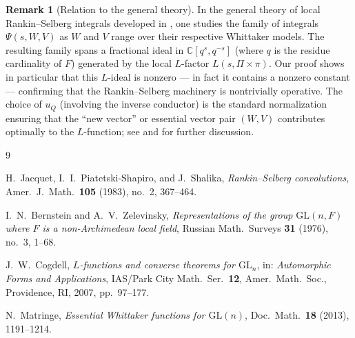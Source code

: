 \documentclass[12pt]{article}
\theoremstyle{definition}
\newtheorem{remark}[theorem]{Remark}
\begin{document}
\begin{remark}[Relation to the general theory]
  In the general theory of local Rankin--Selberg integrals developed in \cite{JPSS83},
  one studies the family of integrals $\Psi(s, W, V)$ as $W$ and $V$ range over their
  respective Whittaker models. The resulting family spans a fractional ideal in
  $\mathbb{C}[q^s, q^{-s}]$ (where $q$ is the residue cardinality of $F$) generated by
  the local $L$-factor $L(s, \Pi \times \pi)$. Our proof shows in particular that this
  $L$-ideal is nonzero — in fact it contains a nonzero constant — confirming that the
  Rankin--Selberg machinery is nontrivially operative. The choice of $u_Q$ (involving the
  inverse conductor) is the standard normalization ensuring that the ``new vector'' or
  essential vector pair $(W, V)$ contributes optimally to the $L$-function; see
  \cite{JPSS83} and \cite{Matringe13} for further discussion.
\end{remark}

\begin{thebibliography}{9}

H.~Jacquet, I.~I.~Piatetski-Shapiro, and J.~Shalika,
\textit{Rankin--Selberg convolutions},
Amer.\ J.\ Math.\ \textbf{105} (1983), no.~2, 367--464.

I.~N.~Bernstein and A.~V.~Zelevinsky,
\textit{Representations of the group $\mathrm{GL}(n,F)$ where $F$ is a non-Archimedean
local field},
Russian Math.\ Surveys \textbf{31} (1976), no.~3, 1--68.

J.~W.~Cogdell,
\textit{$L$-functions and converse theorems for $\mathrm{GL}_n$},
in: \textit{Automorphic Forms and Applications}, IAS/Park City Math.\ Ser.\ \textbf{12},
Amer.\ Math.\ Soc., Providence, RI, 2007, pp.~97--177.

N.~Matringe,
\textit{Essential Whittaker functions for $\mathrm{GL}(n)$},
Doc.\ Math.\ \textbf{18} (2013), 1191--1214.

\end{thebibliography}
\end{document}
